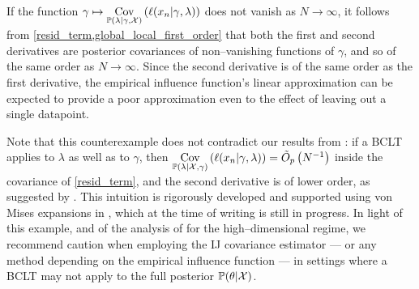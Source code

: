 If the function $\gamma \mapsto \underset{\mathbb{P}(\lambda \vert \gamma,
{\mathcal{X}})}{\mathrm{Cov}}\left(\ell(x_n \vert \gamma, \lambda)\right)$ does not vanish as $N \rightarrow \infty$, it
follows from \eqref{resid_term,global_local_first_order} that both the first and
second derivatives are posterior covariances of non--vanishing functions of
$\gamma$, and so of the same order as $N \rightarrow \infty$.  Since the second
derivative is of the same order as the first derivative, the empirical influence
function's linear approximation can be expected to provide a poor approximation
even to the effect of leaving out a single datapoint.

Note that this counterexample
does not contradict our results from : if a BCLT applies
to $\lambda$ as well as to $\gamma$, then $\underset{\mathbb{P}(\lambda \vert {\mathcal{X}},
\gamma)}{\mathrm{Cov}}\left(\ell(x_n \vert \gamma, \lambda)\right) = \tilde{O}_p\left(N^{-1}\right)$ inside the
covariance of \eqref{resid_term}, and the second derivative is
of lower order, as suggested by .
%
This intuition is rigorously developed and supported using von Mises expansions
in \citet{giordano:2024:oldbayesij}, which at the time of writing is still in
progress.
In light of this example, and of the analysis of
\citet{giordano:2024:oldbayesij} for the high--dimensional regime, we recommend
caution when employing the IJ covariance estimator --- or any method depending
on the empirical influence function ---  in settings where a BCLT may not apply
to the full posterior $\mathbb{P}(\theta | {\mathcal{X}})$.


